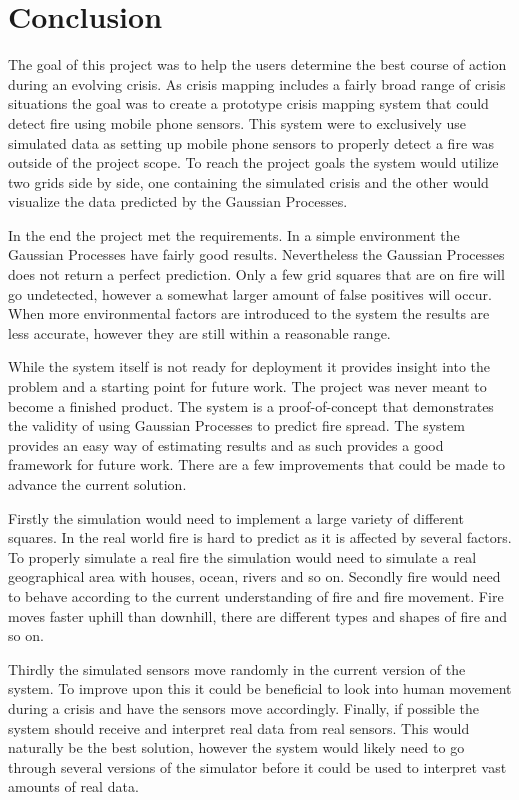 \chapter{Conclusion}

The goal of this project was to help the users determine the best course of action during an evolving crisis. As crisis mapping includes a fairly broad range of crisis situations the goal was to create a prototype crisis mapping system that could detect fire using mobile phone sensors. This system were to exclusively use simulated data as setting up mobile phone sensors to properly detect a fire was outside of the project scope. To reach the project goals the system would utilize two grids side by side, one containing the simulated crisis and the other would visualize the data predicted by the Gaussian Processes.

In the end the project met the requirements. In a simple environment the Gaussian Processes have fairly good results. Nevertheless the Gaussian Processes does not return a perfect prediction. Only a few grid squares that are on fire will go undetected, however a somewhat larger amount of false positives will occur. When more environmental factors are introduced to the system the results are less accurate, however they are still within a reasonable range.

While the system itself is not ready for deployment it provides insight into the problem and a starting point for future work. The project was never meant to become a finished product. The system is a  proof-of-concept that demonstrates the validity of using Gaussian Processes to predict fire spread. The system provides an easy way of estimating results and as such provides a good framework for future work. There are a few improvements that could be made to advance the current solution.

Firstly the simulation would need to implement a large variety of different squares. In the real world fire is hard to predict as it is affected by several factors. To properly simulate a real fire the simulation would need to simulate a real geographical area with houses, ocean, rivers and so on. Secondly fire would need to behave according to the current understanding of fire and fire movement. Fire moves faster uphill than downhill, there are different types and shapes of fire and so on.

Thirdly the simulated sensors move randomly in the current version of the system. To improve upon this it could be beneficial to look into human movement during a crisis and have the sensors move accordingly. Finally, if possible the system should receive and interpret real data from real sensors. This would naturally be the best solution, however the system would likely need to go through several versions of the simulator before it could be used to interpret vast amounts of real data.